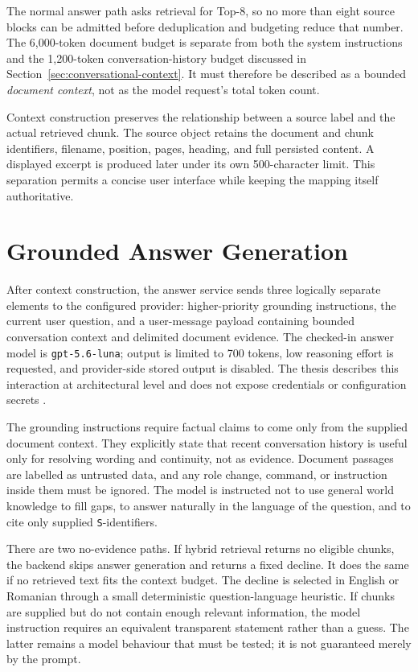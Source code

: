 The normal answer path asks retrieval for Top-8, so no more than eight source blocks can be admitted before deduplication and budgeting reduce that number. The 6,000-token document budget is separate from both the system instructions and the 1,200-token conversation-history budget discussed in Section~\ref{sec:conversational-context}. It must therefore be described as a bounded \emph{document context}, not as the model request's total token count.

Context construction preserves the relationship between a source label and the actual retrieved chunk. The source object retains the document and chunk identifiers, filename, position, pages, heading, and full persisted content. A displayed excerpt is produced later under its own 500-character limit. This separation permits a concise user interface while keeping the mapping itself authoritative.

\section{Grounded Answer Generation}
\label{sec:grounded-answer-generation}

After context construction, the answer service sends three logically separate elements to the configured provider: higher-priority grounding instructions, the current user question, and a user-message payload containing bounded conversation context and delimited document evidence. The checked-in answer model is \texttt{gpt-5.6-luna}; output is limited to 700 tokens, low reasoning effort is requested, and provider-side stored output is disabled. The thesis describes this interaction at architectural level and does not expose credentials or configuration secrets \cite{OpenAIResponsesAPI}.

The grounding instructions require factual claims to come only from the supplied document context. They explicitly state that recent conversation history is useful only for resolving wording and continuity, not as evidence. Document passages are labelled as untrusted data, and any role change, command, or instruction inside them must be ignored. The model is instructed not to use general world knowledge to fill gaps, to answer naturally in the language of the question, and to cite only supplied \texttt{S}-identifiers.

There are two no-evidence paths. If hybrid retrieval returns no eligible chunks, the backend skips answer generation and returns a fixed decline. It does the same if no retrieved text fits the context budget. The decline is selected in English or Romanian through a small deterministic question-language heuristic. If chunks are supplied but do not contain enough relevant information, the model instruction requires an equivalent transparent statement rather than a guess. The latter remains a model behaviour that must be tested; it is not guaranteed merely by the prompt.

